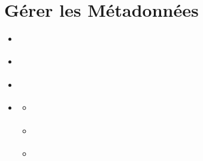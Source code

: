 \documentclass[letterpaper,10pt,english]{sphinxmanual}
\begin{document}
\section{Gérer les Métadonnées}
\label{\detokenize{fr/03_gerer_metadonnees:gerer-les-metadonnees}}\label{\detokenize{fr/03_gerer_metadonnees:metadata-fr}}\label{\detokenize{fr/03_gerer_metadonnees::doc}}
\begin{sphinxcontents}
\begin{itemize}
\item {} 
\sphinxAtStartPar
{}\label{\detokenize{fr/03_gerer_metadonnees:id1}}{\hyperref[\detokenize{fr/03_gerer_metadonnees:qui-peut-modifier-les-metadonnees}]{}}

\item {} 
\sphinxAtStartPar
{}\label{\detokenize{fr/03_gerer_metadonnees:id2}}{\hyperref[\detokenize{fr/03_gerer_metadonnees:ouvrir-l-editeur-de-metadonnees}]{}}

\item {} 
\sphinxAtStartPar
{}\label{\detokenize{fr/03_gerer_metadonnees:id3}}{\hyperref[\detokenize{fr/03_gerer_metadonnees:apercu-de-l-editeur-de-metadonnees}]{}}

\item {} 
\sphinxAtStartPar
{}\label{\detokenize{fr/03_gerer_metadonnees:id4}}{\hyperref[\detokenize{fr/03_gerer_metadonnees:modification-des-champs-de-metadonnees-principaux}]{}}
\begin{itemize}
\item {} 
\sphinxAtStartPar
{}\label{\detokenize{fr/03_gerer_metadonnees:id5}}{\hyperref[\detokenize{fr/03_gerer_metadonnees:titre}]{}}

\item {} 
\sphinxAtStartPar
{}\label{\detokenize{fr/03_gerer_metadonnees:id6}}{\hyperref[\detokenize{fr/03_gerer_metadonnees:resume-abstract}]{}}

\item {} 
\sphinxAtStartPar
{}\label{\detokenize{fr/03_gerer_metadonnees:id7}}{\hyperref[\detokenize{fr/03_gerer_metadonnees:mots-cles}]{}}


\end{itemize}
\end{itemize}
\end{sphinxcontents}
\end{document}
